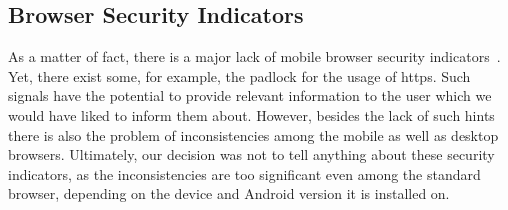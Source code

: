 \subsection{Browser Security Indicators}
As a matter of fact, there is a major lack of mobile browser security indicators~\cite{amrutkar2012measuring,trusteer2011}. 
Yet, there exist some, for example, the padlock for the usage of https.
Such signals have the potential to provide relevant information to the user which we would have liked to inform them about.
However, besides the lack of such hints there is also the problem of inconsistencies among the mobile as well as desktop browsers.
Ultimately, our decision was not to tell anything about these security indicators, as the inconsistencies are too significant even among the standard browser, depending on the device and Android version it is installed on.

